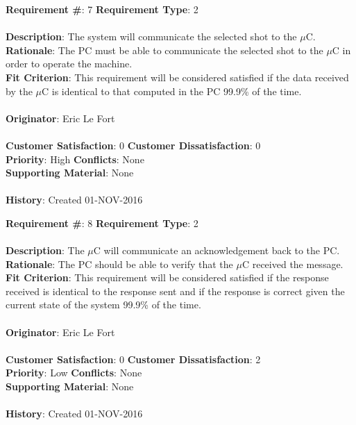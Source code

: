 \documentclass[titlepage]{article}
\begin{document}
\newpage
\begin{framed}
	\noindent\textbf{Requirement \#}: 7 \hfill \textbf{Requirement Type}: 2 \hfill\\\\
	\noindent\textbf{Description}: The system will communicate the selected shot to the $\mu$C.\\
	\textbf{Rationale}: The PC must be able to communicate the selected shot to the $\mu$C in order to operate the machine.\\
	\textbf{Fit Criterion}: This requirement will be considered satisfied if the data received by the $\mu$C is identical to that computed in the PC 99.9\% of the time.\\\\
	\textbf{Originator}: Eric Le Fort\\\\
	\noindent\textbf{Customer Satisfaction}: 0 \hfill 	\textbf{Customer Dissatisfaction}: 0 \hfill\\
	\textbf{Priority}: High \hfill \textbf{Conflicts}: None \hfill\\
	\textbf{Supporting Material}: None\\\\
	\noindent\textbf{History}: Created 01-NOV-2016
\end{framed}

\begin{framed}
	\noindent\textbf{Requirement \#}: 8 \hfill \textbf{Requirement Type}: 2 \hfill\\\\
	\noindent\textbf{Description}: The $\mu$C will communicate an acknowledgement back to the PC.\\
	\textbf{Rationale}: The PC should be able to verify that the $\mu$C received the message.\\
	\textbf{Fit Criterion}: This requirement will be considered satisfied if the response received is identical to the response sent and if the response is correct given the current state of the system 99.9\% of the time.\\\\
	\textbf{Originator}: Eric Le Fort\\\\
	\noindent\textbf{Customer Satisfaction}: 0 \hfill 	\textbf{Customer Dissatisfaction}: 2 \hfill\\
	\textbf{Priority}: Low \hfill \textbf{Conflicts}: None \hfill\\
	\textbf{Supporting Material}: None\\\\
	\noindent\textbf{History}: Created 01-NOV-2016
\end{framed}
\end{document}
